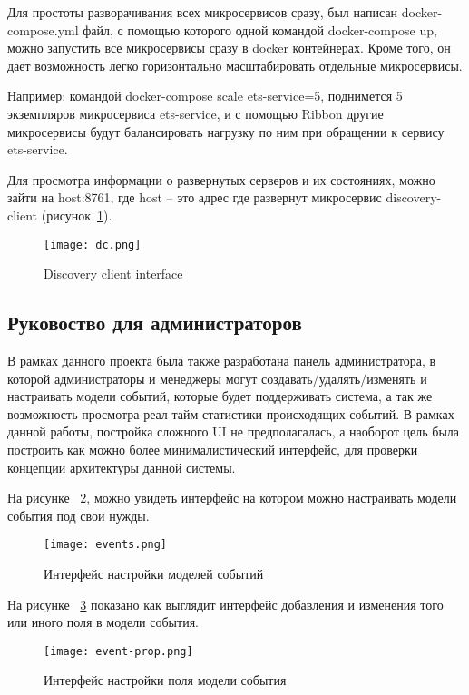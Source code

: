 Для простоты разворачивания всех микросервисов сразу, был написан docker-compose.yml файл, с помощью которого одной командой docker-compose up, можно запустить все микросервисы сразу в docker контейнерах. Кроме того, он дает возможность легко горизонтально масштабировать отдельные микросервисы. 

Например: командой  docker-compose scale ets-service=5, поднимется 5 экземпляров микросервиса ets-service, и с помощью Ribbon другие микросервисы будут балансировать нагрузку по ним при обращении к сервису ets-service.

Для просмотра информации о развернутых серверов и их состояниях, можно зайти на {host:8761}, где host -- это адрес где развернут микросервис discovery-client (рисунок~\ref{fig:dc}).

\begin{figure}[h]
\centering
  \texttt{[image: dc.png]}  
  \caption{Discovery client interface}
	\label{fig:dc}
\end{figure} 


\subsection{Руковоство для администраторов}
\label{sub:manual:admin}

В рамках данного проекта была также разработана панель администратора, в которой администраторы и менеджеры могут создавать/удалять/изменять и настраивать модели событий, которые будет поддерживать система, а так же возможность просмотра реал-тайм статистики происходящих событий. В рамках данной работы, постройка сложного UI не предполагалась, а наоборот цель была построить как можно более минималистический интерфейс, для проверки концепции архитектуры данной системы. 

На рисунке ~\ref{fig:events}, можно увидеть интерфейс на котором можно настраивать модели события под свои нужды.

\pagebreak
\begin{figure}[h]
\centering
  \texttt{[image: events.png]}  
  \caption{Интерфейс настройки моделей событий}
	\label{fig:events}
\end{figure}

На рисунке ~\ref{fig:event-prop} показано как выглядит интерфейс добавления и изменения того или иного поля в модели события.

\begin{figure}[h]
\centering
  \texttt{[image: event-prop.png]}  
  \caption{Интерфейс настройки поля модели события}
	\label{fig:event-prop}
\end{figure}


